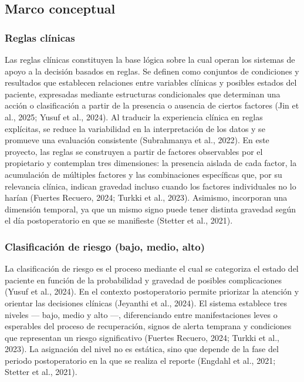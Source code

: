 \documentclass[stu, spanish]{apa7}
\begin{document}
\subsection{Marco conceptual}

\subsubsection{Reglas cl\'{i}nicas}
Las reglas cl\'{i}nicas constituyen la base l\'{o}gica sobre la cual operan los sistemas de apoyo a la decisi\'{o}n basados en reglas. Se definen como conjuntos de condiciones y resultados que establecen relaciones entre variables cl\'{i}nicas y posibles estados del paciente, expresadas mediante estructuras condicionales que determinan una acci\'{o}n o clasificaci\'{o}n a partir de la presencia o ausencia de ciertos factores (Jin et al., 2025; Yusuf et al., 2024). Al traducir la experiencia cl\'{i}nica en reglas expl\'{i}citas, se reduce la variabilidad en la interpretaci\'{o}n de los datos y se promueve una evaluaci\'{o}n consistente (Subrahmanya et al., 2022). En este proyecto, las reglas se construyen a partir de factores observables por el propietario y contemplan tres dimensiones: la presencia aislada de cada factor, la acumulaci\'{o}n de m\'{u}ltiples factores y las combinaciones espec\'{i}ficas que, por su relevancia cl\'{i}nica, indican gravedad incluso cuando los factores individuales no lo har\'{i}an (Fuertes Recuero, 2024; Turkki et al., 2023). Asimismo, incorporan una dimensi\'{o}n temporal, ya que un mismo signo puede tener distinta gravedad seg\'{u}n el d\'{i}a postoperatorio en que se manifieste (Stetter et al., 2021).

\subsubsection{Clasificaci\'{o}n de riesgo (bajo, medio, alto)}
La clasificaci\'{o}n de riesgo es el proceso mediante el cual se categoriza el estado del paciente en funci\'{o}n de la probabilidad y gravedad de posibles complicaciones (Yusuf et al., 2024). En el contexto postoperatorio permite priorizar la atenci\'{o}n y orientar las decisiones cl\'{i}nicas (Jeyanthi et al., 2024). El sistema establece tres niveles --- bajo, medio y alto ---, diferenciando entre manifestaciones leves o esperables del proceso de recuperaci\'{o}n, signos de alerta temprana y condiciones que representan un riesgo significativo (Fuertes Recuero, 2024; Turkki et al., 2023). La asignaci\'{o}n del nivel no es est\'{a}tica, sino que depende de la fase del periodo postoperatorio en la que se realiza el reporte (Engdahl et al., 2021; Stetter et al., 2021).
\end{document}
